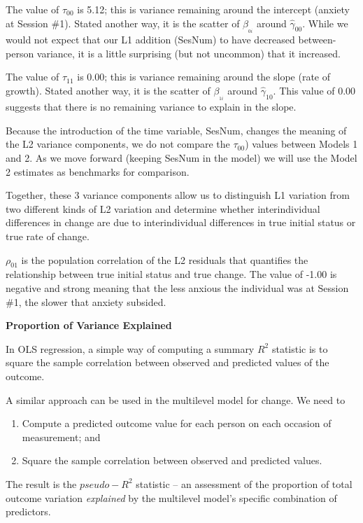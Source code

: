 \documentclass[
  11pt,
]{book}
\providecommand{\tightlist}{%
  \setlength{\itemsep}{0pt}\setlength{\parskip}{0pt}}
\begin{document}
The value of \(\tau _{00}\) is 5.12; this is variance remaining around the intercept (anxiety at Session \#1). Stated another way, it is the scatter of \(\beta _{_{0i}}\) around \(\hat{\gamma }_{00}\). While we would not expect that our L1 addition (SesNum) to have decreased between-person variance, it is a little surprising (but not uncommon) that it increased.

The value of \(\tau _{11}\) is 0.00; this is variance remaining around the slope (rate of growth). Stated another way, it is the scatter of \(\beta _{_{1i}}\) around \(\hat{\gamma }_{10}\). This value of 0.00 suggests that there is no remaining variance to explain in the slope.

Because the introduction of the time variable, SesNum, changes the meaning of the L2 variance components, we do not compare the \(\tau _{00}\)) values between Models 1 and 2. As we move forward (keeping SesNum in the model) we will use the Model 2 estimates as benchmarks for comparison.

Together, these 3 variance components allow us to distinguish L1 variation from two different kinds of L2 variation and determine whether interindividual differences in change are due to interindividual differences in true initial status or true rate of change.

\(\rho_{01}\) is the population correlation of the L2 residuals that quantifies the relationship between true initial status and true change. The value of -1.00 is negative and strong meaning that the less anxious the individual was at Session \#1, the slower that anxiety subsided.

\textbf{Proportion of Variance Explained}

In OLS regression, a simple way of computing a summary \(R^2\) statistic is to square the sample correlation between observed and predicted values of the outcome.

A similar approach can be used in the multilevel model for change. We need to

\begin{enumerate}
\def\labelenumi{\arabic{enumi}.}
\tightlist
\item
  Compute a predicted outcome value for each person on each occasion of measurement; and
\item
  Square the sample correlation between observed and predicted values.
\end{enumerate}

The result is the \(pseudo-R^2\) statistic -- an assessment of the proportion of total outcome variation \emph{explained} by the multilevel model's specific combination of predictors.
\end{document}
